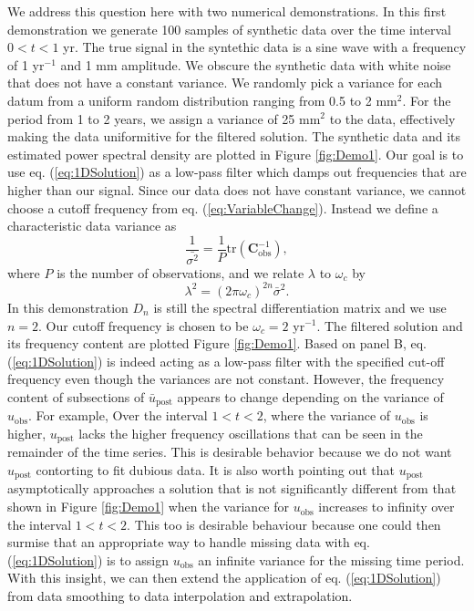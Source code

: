 \documentclass[10pt,a4paper]{article}
\begin{document}
We address this question here with two numerical demonstrations.  In this first demonstration we generate 100 samples of synthetic data over the time interval $0<t<1$ yr.  The true signal in the syntethic data is a sine wave with a frequency of 1 yr$^{-1}$ and 1 mm amplitude.  We obscure the synthetic data with white noise that does not have a constant variance.  We randomly pick a variance for each datum from a uniform random distribution ranging from 0.5 to 2 mm$^2$.  For the period from 1 to 2 years, we assign a variance of 25 mm$^2$ to the data, effectively making the data uniformitive for the filtered solution.  The synthetic data and its estimated power spectral density are plotted in Figure \ref{fig:Demo1}.  Our goal is to use eq. (\ref{eq:1DSolution}) as a low-pass filter which damps out frequencies that are higher than our signal.  Since our data does not have constant variance, we cannot choose a cutoff frequency from eq. (\ref{eq:VariableChange}).  Instead we define a characteristic data variance as
\begin{equation}
\frac{1}{\bar{\sigma^2}} = \frac{1}{P} \mathrm{tr}\left(\mathbf{C}_\mathrm{obs}^{-1}\right),
\end{equation}
where $P$ is the number of observations, and we relate $\lambda$ to $\omega_c$ by
\begin{equation}
\lambda^2 = (2\pi\omega_c)^{2n}\bar{\sigma}^2.  
\end{equation}
In this demonstration $D_n$ is still the spectral differentiation matrix and we use $n=2$. Our cutoff frequency is chosen to be $\omega_c=2$ yr$^{-1}$.  The filtered solution and its frequency content are plotted Figure \ref{fig:Demo1}. Based on panel B, eq. (\ref{eq:1DSolution}) is indeed acting as a low-pass filter with the specified cut-off frequency even though the variances are not constant.  However, the frequency content of subsections of $\bar{u}_\mathrm{post}$ appears to change depending on the variance of $u_\mathrm{obs}$. For example, Over the interval $1<t<2$, where the variance of $u_\mathrm{obs}$ is higher, $u_\mathrm{post}$ lacks the higher frequency oscillations that can be seen in the remainder of the time series. This is desirable behavior because we do not want $u_\mathrm{post}$ contorting to fit dubious data.  It is also worth pointing out that $u_\mathrm{post}$ asymptotically approaches a solution that is not significantly different from that shown in Figure \ref{fig:Demo1} when the variance for $u_\mathrm{obs}$ increases to infinity over the interval $1<t<2$.  This too is desirable behaviour because one could then surmise that an appropriate way to handle missing data with eq. (\ref{eq:1DSolution}) is to assign $u_\mathrm{obs}$ an infinite variance for the missing time period.  With this insight, we can then extend the application of eq. (\ref{eq:1DSolution}) from data smoothing to data interpolation and extrapolation.   
\end{document}
